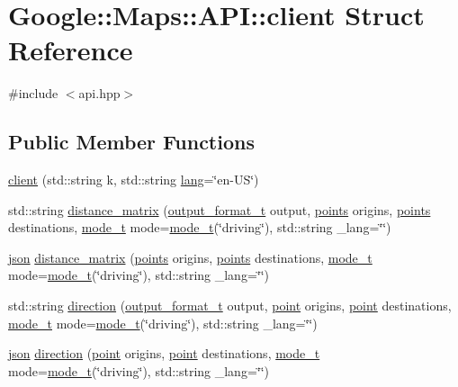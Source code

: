 \hypertarget{a00047}{}\section{Google\+:\+:Maps\+:\+:A\+PI\+:\+:client Struct Reference}
\label{a00047}


{\ttfamily \#include $<$api.\+hpp$>$}

\subsection*{Public Member Functions}
\begin{DoxyCompactItemize}
\item 
\hyperlink{a00047_aa4e453192444e3ed3ae486036e852f03}{client} (std\+::string k, std\+::string \hyperlink{a00047_a4854d3b172e3e823b647897fe8b24f44}{lang}=\char`\"{}en-\/US\char`\"{})
\item 
std\+::string \hyperlink{a00047_a9f4b2db3de411d8f2b074ef7659d4558}{distance\+\_\+matrix} (\hyperlink{a00055}{output\+\_\+format\+\_\+t} output, \hyperlink{a00063}{points} origins, \hyperlink{a00063}{points} destinations, \hyperlink{a00051}{mode\+\_\+t} mode=\hyperlink{a00051}{mode\+\_\+t}(\char`\"{}driving\char`\"{}), std\+::string \+\_\+lang=\char`\"{}\char`\"{})
\item 
\hyperlink{a00011_ab701e3ac61a85b337ec5c1abaad6742d}{json} \hyperlink{a00047_a134d42c2ead69f9243bb736ba3c85df2}{distance\+\_\+matrix} (\hyperlink{a00063}{points} origins, \hyperlink{a00063}{points} destinations, \hyperlink{a00051}{mode\+\_\+t} mode=\hyperlink{a00051}{mode\+\_\+t}(\char`\"{}driving\char`\"{}), std\+::string \+\_\+lang=\char`\"{}\char`\"{})
\item 
std\+::string \hyperlink{a00047_ac58f6dfedbc7536a1014424374add903}{direction} (\hyperlink{a00055}{output\+\_\+format\+\_\+t} output, \hyperlink{a00059}{point} origins, \hyperlink{a00059}{point} destinations, \hyperlink{a00051}{mode\+\_\+t} mode=\hyperlink{a00051}{mode\+\_\+t}(\char`\"{}driving\char`\"{}), std\+::string \+\_\+lang=\char`\"{}\char`\"{})
\item 
\hyperlink{a00011_ab701e3ac61a85b337ec5c1abaad6742d}{json} \hyperlink{a00047_ab9902f76113b10b5e5ef19054e01ffa4}{direction} (\hyperlink{a00059}{point} origins, \hyperlink{a00059}{point} destinations, \hyperlink{a00051}{mode\+\_\+t} mode=\hyperlink{a00051}{mode\+\_\+t}(\char`\"{}driving\char`\"{}), std\+::string \+\_\+lang=\char`\"{}\char`\"{})
\end{DoxyCompactItemize}
